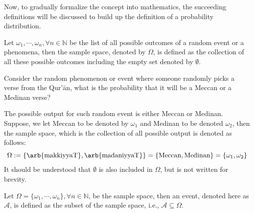Now, to gradually formalize the concept into mathematics, the succeeding definitions will be discussed to build up the definition of a probability distribution.
\begin{defn}
Let $\omega_1,\cdots,\omega_n, \forall n\in\mathbb{N}$ be the list of all possible outcomes of a random event or a phenomena, then the sample space, denoted by $\Omega$, is defined as the collection of all these possible outcomes including the empty set denoted by $\emptyset$.
\end{defn}
\begin{exmp}\label{ex:sample_space}
Consider the random phenomenon or event where someone randomly picks a verse from the Qur'\=an, what is the probability that it will be a Meccan  or a Medinan  verse?

The possible output for such random event is either Meccan or Medinan. Suppose, we let Meccan to be denoted by $\omega_1$ and Medinan to be denoted $\omega_2$, then the sample space, which is the collection of all possible output is denoted as follows:
\begin{equation}\label{ex_eq:sample_space}
    \Omega:=\{\text{\arb{makkiyyaT}},\text{\arb{madaniyyaT}}\}=\{\text{Meccan}, \text{Medinan}\}=\{\omega_1,\omega_2\}
\end{equation}
It should be understood that $\emptyset$ is also included in $\Omega$, but is not written for brevity.

\end{exmp}
\begin{defn}[Event]
Let $\Omega=\{\omega_1,\cdots,\omega_n\}, \forall n\in\mathbb{N}$, be the sample space, then an event, denoted here as $\mathscr{A}$, is defined as the subset of the sample space, i.e., $\mathscr{A}\subseteq{\Omega}$.
\end{defn}
